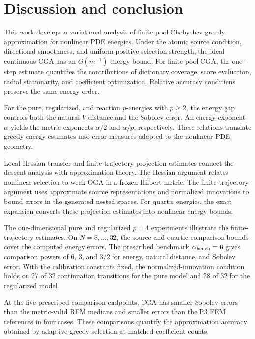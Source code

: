 \section{Discussion and conclusion}
\label{sec:discussion}

This work develops a variational analysis of finite-pool Chebyshev greedy approximation for nonlinear PDE energies. Under the atomic source condition, directional smoothness, and uniform positive selection strength, the ideal continuous CGA has an \(O(m^{-1})\) energy bound. For finite-pool CGA, the one-step estimate quantifies the contributions of dictionary coverage, score evaluation, radial stationarity, and coefficient optimization. Relative accuracy conditions preserve the same energy order.

For the pure, regularized, and reaction \(p\)-energies with \(p\ge2\), the energy gap controls both the natural \(V\)-distance and the Sobolev error. An energy exponent \(\alpha\) yields the metric exponents \(\alpha/2\) and \(\alpha/p\), respectively. These relations translate greedy energy estimates into error measures adapted to the nonlinear PDE geometry.

Local Hessian transfer and finite-trajectory projection estimates connect the descent analysis with approximation theory. The Hessian argument relates nonlinear selection to weak OGA in a frozen Hilbert metric. The finite-trajectory argument uses approximate source representations and normalized innovations to bound errors in the generated nested spaces. For quartic energies, the exact expansion converts these projection estimates into nonlinear energy bounds.

The one-dimensional pure and regularized \(p=4\) experiments illustrate the finite-trajectory estimates. On \(N=8,\ldots,32\), the source and quartic comparison bounds cover the computed energy errors. The prescribed benchmark \(\alpha_{\rm bench}=6\) gives comparison powers of \(6\), \(3\), and \(3/2\) for energy, natural distance, and Sobolev error. With the calibration constants fixed, the normalized-innovation condition holds on 27 of 32 continuation transitions for the pure model and 28 of 32 for the regularized model.

At the five prescribed comparison endpoints, CGA has smaller Sobolev errors than the metric-valid RFM medians and smaller errors than the P3 FEM references in four cases. These comparisons quantify the approximation accuracy obtained by adaptive greedy selection at matched coefficient counts.

